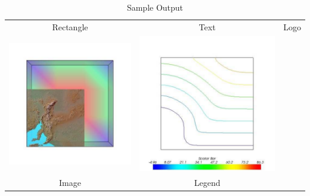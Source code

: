 \begin{table}[t]
\begin{tabular}{c c c}
Rectangle & Text & Logo \\
\includegraphics[width=\thumbnailwidth]{figures/Image} &
\includegraphics[width=\thumbnailwidth]{figures/Legend} \\ 
Image & Legend \\
\end{tabular}
\caption{Sample Output}
\end{table}


